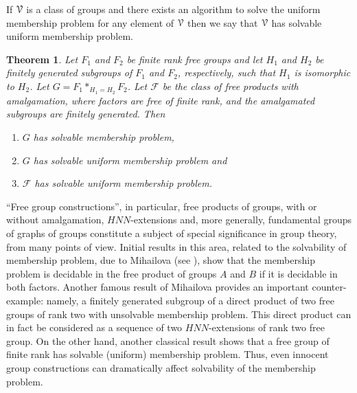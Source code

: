 \documentclass[a4paper,12pt]{article}
\newcommand{\e}{\varepsilon }
\newcommand{\cF}{{\cal{F}}}
\newcommand{\cV}{{\cal{V}}}
\newtheorem{theorem}{Theorem}[section]
\numberwithin{equation}{section}
\numberwithin{figure}{section}
\newcommand{\NN}{\ensuremath{\mathbb{N}}}
\newcommand{\FF}{\ensuremath{\mathbb{F}}}
\renewcommand{\cF}{\mathcal{F}}
\newcommand{\be}{\begin{enumerate}}
\newcommand{\ee}{\end{enumerate}}
\begin{document}

If $\cV$ is a class of groups and there exists an algorithm to
solve the uniform membership %
 problem for any element of $\cV$ then
we say that $\cV$ has solvable uniform  %
 membership problem.

\begin{theorem}\label{thm:membership}
Let $F_1$ and $F_2$ be finite rank free groups and let $H_1$ and $H_2$
be finitely generated subgroups of $F_1$ and $F_2$, respectively, such
that $H_1$ is isomorphic to $H_2$. Let $G=F_1 \ast_{H_1=H_2} F_2$.
Let $\cF$ be the class of free products with amalgamation, where
factors are free of finite rank, and the amalgamated subgroups are
finitely generated.
Then
\be
\item\label{it:membership}
$G$ has solvable membership problem,
\item \label{it:uni-membership}
$G$ has solvable uniform  membership problem and
\item\label{it:class-uni-membership}
$\cF$ has solvable uniform  membership problem.
\ee
\end{theorem}


``Free group constructions'', in particular, free products of groups,
with or without amalgamation, $HNN$-extensions
 and, more generally, fundamental groups
of graphs of groups constitute a subject of special significance in
group theory, from many points of view. Initial results in this area,
related to the solvability of membership problem,  due to Mihailova (see
\cite{mi59,mi68}), show that the membership problem is
decidable in the free product of groups $A$ and $B$ if it is decidable
in both factors. Another famous result of
Mihailova \cite{mi58}  provides an important counter-example:
 namely,  a finitely generated
subgroup of a direct product of two free groups of rank two with
unsolvable membership problem.  This direct
product can in fact be considered as a sequence of two $HNN$-extensions
of rank two free group. On the other hand, another classical
result \cite[Proposition 2.21]{LS} shows that a free group of finite rank has
solvable (uniform)
membership problem. Thus,  even innocent group
constructions can dramatically affect solvability of the membership problem.
\end{document}
